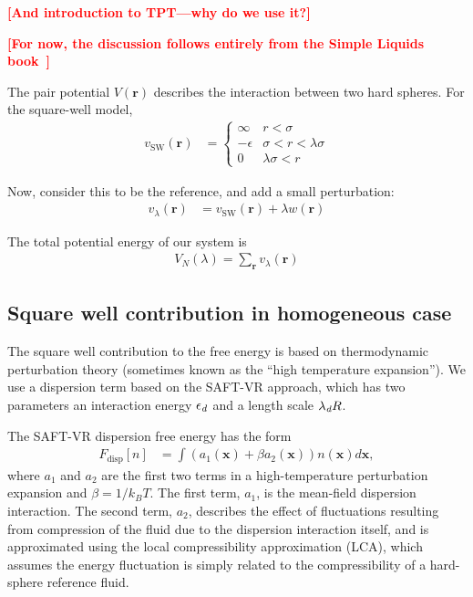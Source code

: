\documentclass[letterpaper,twocolumn,amsmath,amssymb,pre,aps,10pt]{revtex4-1}
\newcommand\xx{\mathbf{x}}
\newcommand\rr{\mathbf{r}}
\newcommand\fixme[1]{\textcolor{red}{\textbf{[#1]}}}
\begin{document}
\fixme{And introduction to TPT---why do we use it?}

\fixme{For now, the discussion follows entirely from the Simple Liquids book~\cite{simple-liquids}}


The pair potential $V(\rr)$ describes the interaction between two hard spheres. For the square-well model,
\begin{align}
  v_\text{SW}(\rr) &=
    \begin{cases}
      \infty & r < \sigma \\
      -\epsilon & \sigma < r < \lambda\sigma \\
      0 & \lambda\sigma < r
    \end{cases}
\end{align}

Now, consider this to be the reference, and add a small perturbation:
\begin{align}
  v_\lambda(\rr) &= v_\text{SW}(\rr) + \lambda w(\rr)
\end{align}

The total potential energy of our system is
\begin{align}
  V_N(\lambda) = \sum_\rr v_\lambda(\rr)
\end{align}



\subsection{Square well contribution in homogeneous case}
The square well contribution to the free energy is based on
thermodynamic perturbation theory (sometimes known as the ``high
temperature expansion'').  We use a dispersion term based on the
SAFT-VR approach\cite{gil-villegas-1997-SAFT-VR}, which has two
parameters an interaction energy $\epsilon_\textit{d}$ and a length scale
$\lambda_\textit{d} R$.

The SAFT-VR dispersion free energy has the form~\cite{gil-villegas-1997-SAFT-VR}
\begin{align}
  F_\text{disp}[n] &= \int \left(a_1(\xx) + \beta a_2(\xx)\right)n(\xx)d\xx,
\end{align}
where $a_1$ and $a_2$ are the first two terms in a high-temperature
perturbation expansion and $\beta=1/k_BT$.  The first term, $a_1$, is
the mean-field dispersion interaction. The second term, $a_2$, describes the
effect of fluctuations resulting from compression of the fluid due
to the dispersion interaction itself, and is approximated
using the local compressibility approximation (LCA), which
assumes the energy fluctuation is simply related to the
compressibility of a hard-sphere reference fluid\cite{barker1976liquid}.
\end{document}
